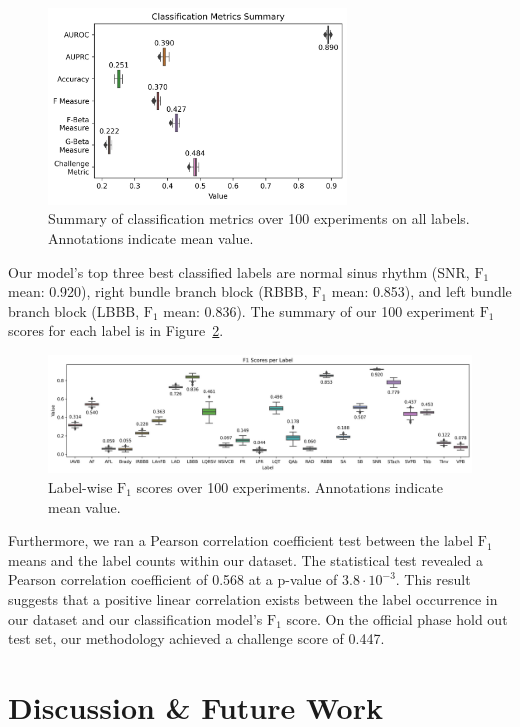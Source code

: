 \documentclass[twocolumn]{cinc}
\begin{document}
\begin{figure}[hb]
  \centering
  \includegraphics[width=7.9cm]{fig/classification_metrics.png}
  \caption{Summary of classification metrics over 100 experiments on all labels. Annotations indicate mean value.}
  \label{fig:classification_metrics_summary}
\end{figure}

Our model's top three best classified labels are normal sinus rhythm (SNR, $\text{F}_1$ mean: 0.920), right bundle branch block (RBBB, $\text{F}_1$ mean: 0.853), and left bundle branch block (LBBB, $\text{F}_1$ mean: 0.836).
The summary of our 100 experiment $\text{F}_1$ scores for each label is in Figure~\ref{fig:f1_score}.

\begin{figure}[ht]
  \centering
  \includegraphics[width=17.0cm]{fig/label_f1s.png}
  \caption{Label-wise $\text{F}_1$ scores over 100 experiments. Annotations indicate mean value.}
  \label{fig:f1_score}
\end{figure}

Furthermore, we ran a Pearson correlation coefficient test between the label $\text{F}_1$ means and the label counts within our dataset.
The statistical test revealed a Pearson correlation coefficient of 0.568 at a p-value of $3.8 \cdot 10^{-3}$.
This result suggests that a positive linear correlation exists between the label occurrence in our dataset and our classification model's $\text{F}_1$ score.
On the official phase hold out test set, our methodology achieved a challenge score of 0.447.


\section{Discussion \& Future Work}
\end{document}
